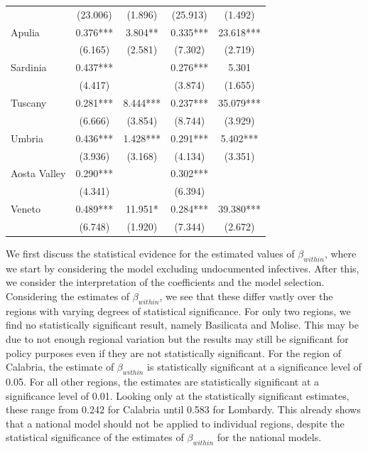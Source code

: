 \documentclass[12pt]{article}
\begin{document}
\begin{longtable}{@{}lcccc@{}}
         & (23.006) & (1.896) & (25.913) & (1.492) \\ 
        Apulia & 0.376*** & 3.804** & 0.335*** & 23.618*** \\ 
         & (6.165) & (2.581) & (7.302) & (2.719) \\ 
        Sardinia & 0.437*** &  & 0.276*** & 5.301 \\ 
         & (4.417) &  & (3.874) & (1.655) \\ 
        Tuscany & 0.281*** & 8.444*** & 0.237*** & 35.079*** \\ 
         & (6.666) & (3.854) & (8.744) & (3.929) \\ 
        Umbria & 0.436*** & 1.428*** & 0.291*** & 5.402*** \\ 
         & (3.936) & (3.168) & (4.134) & (3.351) \\ 
        Aosta Valley & 0.290*** &  & 0.302*** &  \\ 
         & (4.341) &  & (6.394) &  \\ 
        Veneto & 0.489*** & 11.951* & 0.284*** & 39.380*** \\ 
         & (6.748) & (1.920) & (7.344) & (2.672) \\* \bottomrule
	\end{longtable}

    We first discuss the statistical evidence for the estimated values of $\beta_{within}$, where we start by considering the model excluding undocumented infectives. After this, we consider the interpretation of the coefficients and the model selection. Considering the estimates of $\beta_{within}$, we see that these differ vastly over the regions with varying degrees of statistical significance. For only two regions, we find no statistically significant result, namely Basilicata and Molise. This may be due to not enough regional variation but the results may still be significant for policy purposes even if they are not statistically significant. For the region of Calabria, the estimate of $\beta_{within}$ is statistically significant at a significance level of 0.05. For all other regions, the estimates are statistically significant at a significance level of 0.01. Looking only at the statistically significant estimates, these range from 0.242 for Calabria until 0.583 for Lombardy. This already shows that a national model should not be applied to individual regions, despite the statistical significance of the estimates of $\beta_{within}$ for the national models. \\
\end{document}

